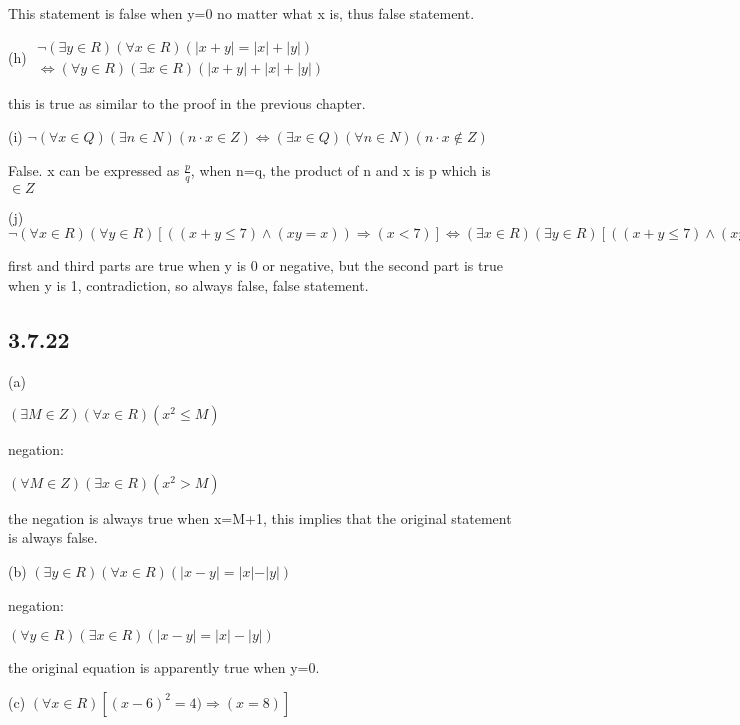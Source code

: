 \documentclass{article}
\begin{document}
This statement is false when y=0 no matter what x is, thus false statement.

(h) $\begin{matrix}\neg\left(\exists y\in R\right)\left(\forall x\in R\right)\left(\left|x+y\right|=\left|x\right|+\left|y\right|\right)\\ \Leftrightarrow\left(\forall y\in R\right)\left(\exists x\in R\right)\left(\left|x+y\right|+\left|x\right|+\left|y\right|\right)\end{matrix}$

this is true as similar to the proof in the previous chapter.

(i) $\neg\left(\forall x\in Q\right)\left(\exists n\in N\right)\left(n\cdot x\in Z\right)\Leftrightarrow\left(\exists x\in Q\right)\left(\forall n\in N\right)\left(n\cdot x\notin Z\right)$

False. x can be expressed as $\frac{p}{q}$, when n=q, the product of n and x is p which is $\in Z$

(j) $\neg(\forall x\in R)(\forall y\in R)[((x+y\leq7)\land(x y=x))\Rightarrow(x<7)] \iff (\exists x\in R)(\exists y\in R)[((x+y\leq7)\land(x y=x))\land(x\geq7)]$

first and third parts are true when y is 0 or negative, but the second part is true when y is 1, contradiction, so always false, false statement.

\subsection*{3.7.22}

(a)

$\left(\exists M\in Z\right)\left(\forall x\in R\right)\left(x^{2}\leq M\right)$

negation:

$\left(\forall M\in Z\right)\left(\exists x\in R\right)\left(x^{2}>M\right)$

the negation is always true when x=M+1, this implies that the original statement is always false.

(b) $\left(\exists y\in R\right)\left(\forall x\in R\right)\left(\vert x-y\vert=\vert x\vert-\vert y\vert\right)$

negation:

$\left(\forall y\in R\right)\left(\exists x\in R\right)\left(\left|x-y\right|=\left|x\right|-\left|y\right|\right)$

the original equation is apparently true when y=0.

(c) $(\forall x\in R)[(x-6)^{2}=4)\Rightarrow(x=8)]$
\end{document}
